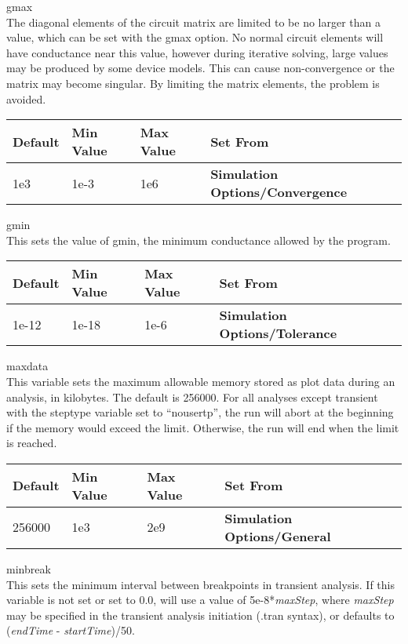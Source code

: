 \begin{description}
\item{\et gmax}\\
The diagonal elements of the circuit matrix are limited to be no
larger than a value, which can be set with the {\et gmax} option.  No
normal circuit elements will have conductance near this value, however
during iterative solving, large values may be produced by some device
models.  This can cause non-convergence or the matrix may become
singular.  By limiting the matrix elements, the problem is avoided.

\begin{tabular}{|l|l|l|l|}\hline
\bf Default & \bf Min Value & \bf Max Value & \bf Set From\\ \hline
1e3 & 1e-3 & 1e6 & \bf Simulation Options/Convergence\\ \hline
\end{tabular}

\item{\et gmin}\\
This sets the value of {\vt gmin}, the minimum conductance allowed by the
program.

\begin{tabular}{|l|l|l|l|}\hline
\bf Default & \bf Min Value & \bf Max Value & \bf Set From\\ \hline
1e-12 & 1e-18 & 1e-6 & \bf Simulation Options/Tolerance\\ \hline
\end{tabular}

\item{\et maxdata}\\
This variable sets the maximum allowable memory stored as plot data
during an analysis, in kilobytes.  The default is 256000.  For all
analyses except transient with the {\et steptype} variable set to
``{\vt nousertp}'', the run will abort at the beginning if the memory
would exceed the limit.  Otherwise, the run will end when the limit is
reached.

\begin{tabular}{|l|l|l|l|}\hline
\bf Default & \bf Min Value & \bf Max Value & \bf Set From\\ \hline
256000 & 1e3 & 2e9 & \bf Simulation Options/General\\ \hline
\end{tabular}

\item{\et minbreak}\\
This sets the minimum interval between breakpoints in transient
analysis.  If this variable is not set or set to 0.0, {\WRspice} will
use a value of 5e-8*{\it maxStep}, where {\it maxStep} may be
specified in the transient analysis initiation ({\vt .tran} syntax),
or defaults to ({\it endTime} - {\it startTime\/})/50.


\end{description}

